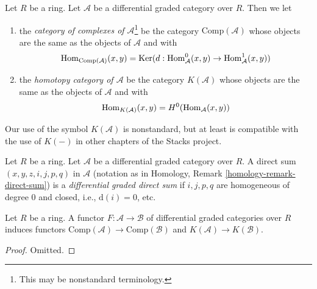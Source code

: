 \begin{definition}
\label{definition-homotopy-category-of-dga-category}
Let $R$ be a ring. Let $\mathcal{A}$ be a differential graded category
over $R$. Then we let
\begin{enumerate}
\item the {\it category of complexes of $\mathcal{A}$}\footnote{This may
be nonstandard terminology.} be the category
$\text{Comp}(\mathcal{A})$ whose objects are the same as the objects
of $\mathcal{A}$ and with
$$
\mathop{\mathrm{Hom}}\nolimits_{\text{Comp}(\mathcal{A})}(x, y) =
\mathop{\mathrm{Ker}}(d : \mathop{\mathrm{Hom}}\nolimits^0_\mathcal{A}(x, y) \to \mathop{\mathrm{Hom}}\nolimits^1_\mathcal{A}(x, y))
$$
\item the {\it homotopy category of $\mathcal{A}$} be the category
$K(\mathcal{A})$ whose objects are the same as the objects
of $\mathcal{A}$ and with
$$
\mathop{\mathrm{Hom}}\nolimits_{K(\mathcal{A})}(x, y) = H^0(\mathop{\mathrm{Hom}}\nolimits_\mathcal{A}(x, y))
$$
\end{enumerate}
\end{definition}

\noindent
Our use of the symbol $K(\mathcal{A})$ is nonstandard, but at least
is compatible with the use of $K(-)$ in other chapters of the Stacks project.

\begin{definition}
\label{definition-dg-direct-sum}
Let $R$ be a ring. Let $\mathcal{A}$ be a differential graded category over
$R$. A direct sum $(x, y, z, i, j, p, q)$ in $\mathcal{A}$ (notation as in
Homology, Remark \ref{homology-remark-direct-sum})
is a {\it differential graded direct sum} if $i, j, p, q$ are homogeneous
of degree $0$ and closed, i.e., $\text{d}(i) = 0$, etc.
\end{definition}

\begin{lemma}
\label{lemma-functorial}
Let $R$ be a ring. A functor $F : \mathcal{A} \to \mathcal{B}$
of differential graded categories over $R$ induces functors
$\text{Comp}(\mathcal{A}) \to \text{Comp}(\mathcal{B})$
and $K(\mathcal{A}) \to K(\mathcal{B})$.
\end{lemma}

\begin{proof}
Omitted.
\end{proof}

